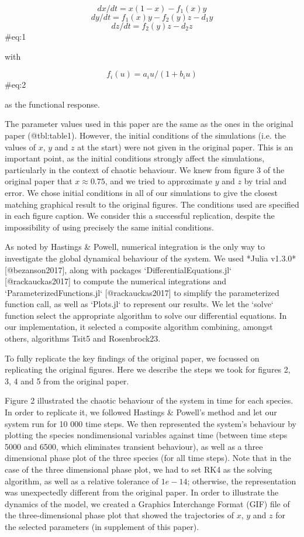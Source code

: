 $$ dx/dt = x(1 - x) - f_1(x)y $$
$$ dy/dt = f_1(x)y - f_2(y)z - d_1y $$
$$ dz/dt = f_2(y)z - d_2z $$ {#eq:1}

with

$$ f_i(u) = a_iu/(1 + b_iu) $$ {#eq:2}

as the functional response.

The parameter values used in this paper are the same as the ones in the original paper
(@tbl:table1). However, the initial conditions of the simulations (i.e. the values of $x$,
$y$ and $z$ at the start) were not given in the original paper.
This is an important point, as the initial conditions strongly affect the simulations,
particularly in the context of chaotic behaviour.
We knew from figure 3 of the original paper that $x \approx 0.75$, and we tried to
approximate $y$ and $z$ by trial and error.
We chose initial conditions in all of our simulations to give the closest matching
graphical result to the original figures.
The conditions used are specified in each figure caption.
We consider this a successful replication, despite the impossibility of using precisely
the same initial conditions.

As noted by Hastings & Powell, numerical integration is the only way to investigate the
global dynamical behaviour of the system.
We used *Julia v1.3.0* [@bezanson2017], along with packages `DifferentialEquations.jl`
[@rackauckas2017] to compute the numerical integrations and `ParameterizedFunctions.jl`
[@rackauckas2017] to simplify the parameterized function call, as well as `Plots.jl` to represent
our results. We let the `solve` function select the appropriate algorithm to solve our
differential equations.
In our implementation, it selected a composite algorithm combining, amongst others,
algorithms Tsit5 and Rosenbrock23.

To fully replicate the key findings of the original paper, we focussed on replicating the
original figures.
Here we describe the steps we took for figures 2, 3, 4 and 5 from the original paper.

Figure 2 illustrated the chaotic behaviour of the system in time for each species.
In order to replicate it, we followed Hastings & Powell's method and let our system run
for 10 000 time steps.
We then represented the system's behaviour by plotting the species nondimensional
variables against time (between time steps 5000 and 6500, which eliminates transient
behaviour), as well as a three dimensional phase plot of the three species (for all time
steps). Note that in the case of the three dimensional phase plot, we had to set RK4 as
the solving algorithm, as well as a relative tolerance of $1e-14$; otherwise, the
representation was unexpectedly different from the original paper.
In order to illustrate the dynamics of the model, we created a Graphics Interchange Format
(GIF) file of the three-dimensional phase plot that showed the trajectories of $x$, $y$
and $z$ for the selected parameters (in supplement of this paper).

